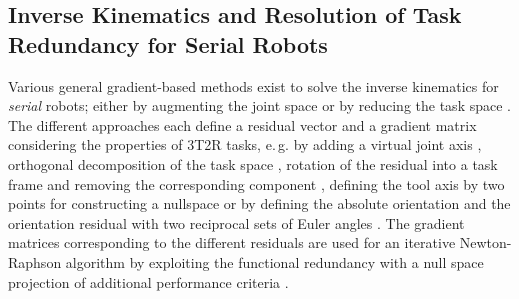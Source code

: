 \documentclass[robotics,article,submit,moreauthors,pdftex]{Definitions/mdpi}
\begin{document}
\subsection{Inverse Kinematics and Resolution of Task Redundancy for Serial Robots}

Various general gradient-based methods exist to solve the inverse kinematics for \emph{serial} robots; either by augmenting the joint space \cite{Baron2000} or by reducing the task space \cite{HuoBar2005,LegerAng2016,Zlajpah2017,ZhuQuCaoYan2013,GuoDonKe2015,1_SchapplerTapOrt2019}.
The different approaches each define a residual vector and a gradient matrix considering the properties of 3T2R tasks, e.\,g. by adding a virtual joint axis \cite{Baron2000}, orthogonal decomposition of the task space \cite{HuoBar2005}, rotation of the residual into a task frame and removing the corresponding component \cite{Zlajpah2017}, defining the tool axis by two points for constructing a nullspace \cite{LegerAng2016} or by defining the absolute orientation and the orientation residual with two reciprocal sets of Euler angles \cite{1_SchapplerTapOrt2019}.
The gradient matrices corresponding to the different residuals are used for an iterative Newton-Raphson algorithm \cite{Yoshikawa1984,GoldenbergBenFen1985} by exploiting the functional redundancy with a null space projection of additional performance criteria \cite{Yoshikawa1984}.
\end{document}
